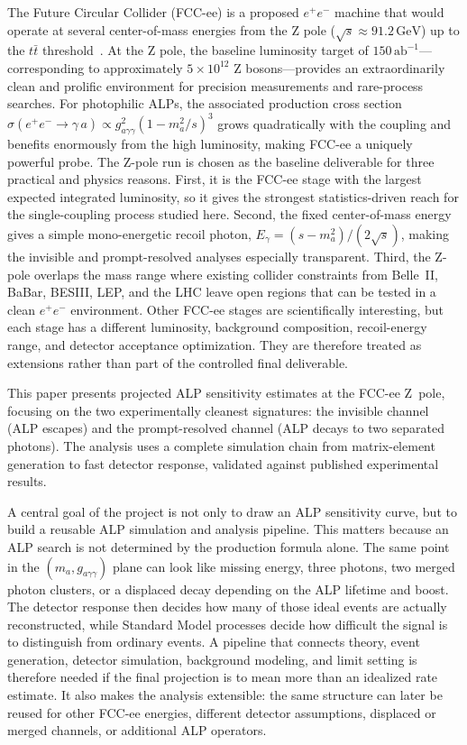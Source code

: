 \documentclass[12pt,a4paper]{article}
\begin{document}
The Future Circular Collider (FCC-ee) is a proposed $e^+e^-$ machine
that would operate at several center-of-mass energies from the Z pole
($\sqrt{s} \approx 91.2\,\text{GeV}$) up to the $t\bar{t}$ threshold~\cite{FCCee_CDR,FCC_Physics}.
At the Z pole, the baseline luminosity target of $150\,\text{ab}^{-1}$---corresponding
to approximately $5\times10^{12}$ Z bosons---provides an extraordinarily
clean and prolific environment for precision measurements and rare-process
searches.
For photophilic ALPs, the associated production cross section
$\sigma(e^+e^-\to\gamma\,a) \propto g_{a\gamma\gamma}^2(1-m_{a}^2/s)^3$ grows quadratically with the
coupling and benefits enormously from the high luminosity, making FCC-ee a
uniquely powerful probe.
The Z-pole run is chosen as the baseline deliverable for three practical and
physics reasons. First, it is the FCC-ee stage with the largest expected
integrated luminosity, so it gives the strongest statistics-driven reach for
the single-coupling process studied here. Second, the fixed center-of-mass
energy gives a simple mono-energetic recoil photon,
$E_\gamma=(s-m_{a}^2)/(2\sqrt{s})$, making the invisible and prompt-resolved
analyses especially transparent. Third, the Z-pole overlaps the mass range
where existing collider constraints from Belle~II, BaBar, BESIII, LEP, and the
LHC leave open regions that can be tested in a clean $e^+e^-$ environment.
Other FCC-ee stages are scientifically interesting, but each stage has a
different luminosity, background composition, recoil-energy range, and
detector acceptance optimization. They are therefore treated as extensions
rather than part of the controlled final deliverable.

This paper presents projected ALP sensitivity estimates at the FCC-ee
Z~pole, focusing on the two experimentally cleanest signatures: the
invisible channel (ALP escapes) and the prompt-resolved channel (ALP decays
to two separated photons).
The analysis uses a complete simulation chain from matrix-element
generation to fast detector response, validated against published experimental
results.

A central goal of the project is not only to draw an ALP sensitivity curve,
but to build a reusable ALP simulation and analysis pipeline.
This matters because an ALP search is not determined by the production formula
alone. The same point in the $(m_{a},g_{a\gamma\gamma})$ plane can look like missing energy,
three photons, two merged photon clusters, or a displaced decay depending on
the ALP lifetime and boost. The detector response then decides how many of
those ideal events are actually reconstructed, while Standard Model processes
decide how difficult the signal is to distinguish from ordinary events.
A pipeline that connects theory, event generation, detector simulation,
background modeling, and limit setting is therefore needed if the final
projection is to mean more than an idealized rate estimate. It also makes the
analysis extensible: the same structure can later be reused for other FCC-ee
energies, different detector assumptions, displaced or merged channels, or
additional ALP operators.
\end{document}

